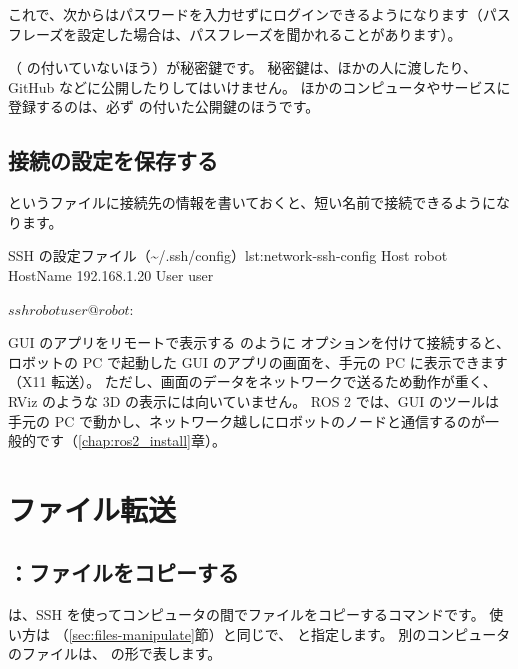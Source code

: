これで、次からはパスワードを入力せずにログインできるようになります（パスフレーズを設定した場合は、パスフレーズを聞かれることがあります）。

\begin{caution}[秘密鍵は絶対に渡さない]
  （ の付いていないほう）が秘密鍵です。
  秘密鍵は、ほかの人に渡したり、GitHub などに公開したりしてはいけません。
  ほかのコンピュータやサービスに登録するのは、必ず  の付いた公開鍵のほうです。
\end{caution}

\subsection{接続の設定を保存する}

 というファイルに接続先の情報を書いておくと、短い名前で接続できるようになります。

\begin{codelisting}{SSH の設定ファイル（\textasciitilde/.ssh/config）}{lst:network-ssh-config}
Host robot
    HostName 192.168.1.20
    User user
\end{codelisting}

\begin{termexample}[設定した名前で接続する]
$ ssh robot
user@robot:~$
\end{termexample}

\begin{tips}{GUI のアプリをリモートで表示する}
   のように  オプションを付けて接続すると、ロボットの PC で起動した GUI のアプリの画面を、手元の PC に表示できます（X11 転送）。
  ただし、画面のデータをネットワークで送るため動作が重く、RViz のような 3D の表示には向いていません。
  ROS 2 では、GUI のツールは手元の PC で動かし、ネットワーク越しにロボットのノードと通信するのが一般的です（\ref{chap:ros2_install}章）。
\end{tips}

\section{ファイル転送}
\label{sec:network-transfer}

\subsection{：ファイルをコピーする}

 は、SSH を使ってコンピュータの間でファイルをコピーするコマンドです。
使い方は （\ref{sec:files-manipulate}節）と同じで、 と指定します。
別のコンピュータのファイルは、 の形で表します。


